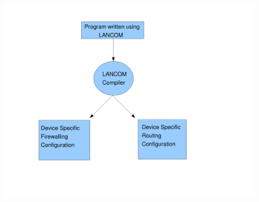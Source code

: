 \begin{figure}[ht] 
\label {fig:block_dgm}

\begin{center}
\includegraphics[scale=0.35]{figs/language_blk_dgm.pdf}
\end{center}
 \end{figure}
